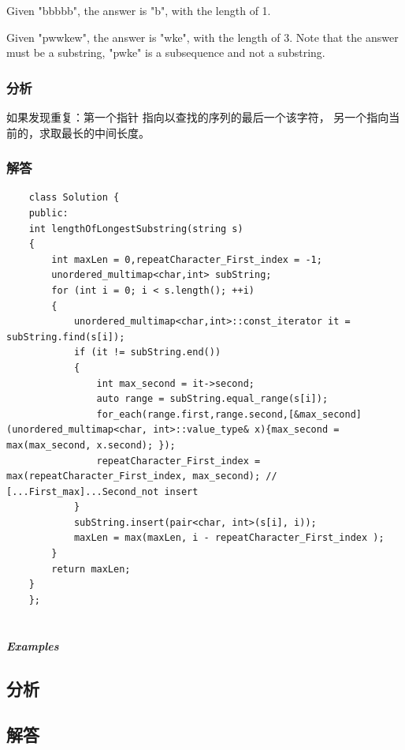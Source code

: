 \documentclass[UTF8,a4paper,12pt]{ctexbook}
\begin{document}
	Given "bbbbb", the answer is "b", with the length of 1.
	
	Given "pwwkew", the answer is "wke", with the length of 3. Note that the answer must be a substring, "pwke" is a subsequence and not a substring.
	
	\subsubsection{分析}
	如果发现重复：第一个指针 指向以查找的序列的最后一个该字符， 另一个指向当前的，求取最长的中间长度。
	\subsubsection{解答}
	\begin{lstlisting}
	class Solution {
	public:
	int lengthOfLongestSubstring(string s) 
	{
		int maxLen = 0,repeatCharacter_First_index = -1;
		unordered_multimap<char,int> subString;
		for (int i = 0; i < s.length(); ++i)
		{
			unordered_multimap<char,int>::const_iterator it = subString.find(s[i]);
			if (it != subString.end())
			{
				int max_second = it->second;
				auto range = subString.equal_range(s[i]);
				for_each(range.first,range.second,[&max_second](unordered_multimap<char, int>::value_type& x){max_second = max(max_second, x.second); });
				repeatCharacter_First_index = max(repeatCharacter_First_index, max_second);	// [...First_max]...Second_not insert
			}
			subString.insert(pair<char, int>(s[i], i));
			maxLen = max(maxLen, i - repeatCharacter_First_index );
		}
		return maxLen;
	}
	};
	\end{lstlisting}
	
\section{}
	
	\subparagraph{Examples}
	
	\subsection{分析}
	
	\subsection{解答}
	
\section{}
	
\end{document}
